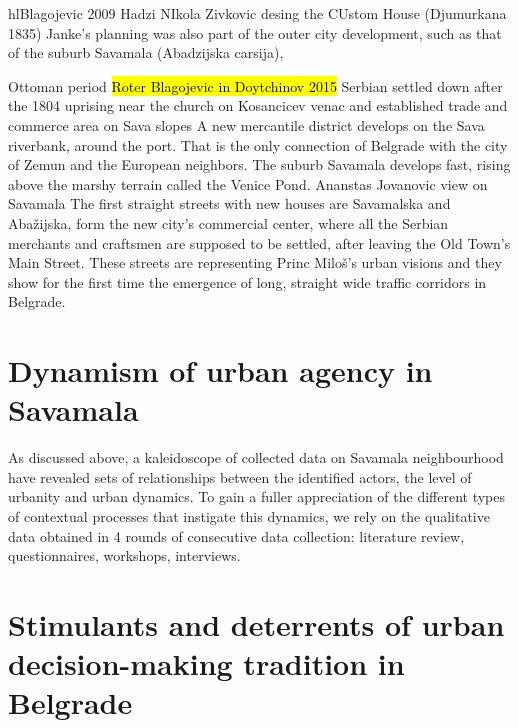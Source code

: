 \documentclass[11pt]{report}
\begin{document}
hl{Blagojevic 2009}
Hadzi NIkola Zivkovic desing the CUstom House (Djumurkana 1835)
Janke’s planning was also part of the outer city development, such as that of the suburb Savamala (Abadzijska carsija), 

Ottoman period
	\hl{Roter Blagojevic in Doytchinov 2015}
Serbian settled down after the 1804 uprising near the church on Kosancicev venac and established trade and commerce area on Sava slopes
A new mercantile district develops on the Sava riverbank, around the port. That is the only connection of Belgrade with the city of Zemun and the European neighbors. The suburb Savamala develops fast, rising above the marshy terrain called the Venice Pond.
Ananstas Jovanovic view on Savamala
The first straight streets with new  houses  are  Savamalska  and  Abažijska,  form  the  new  city’s  commercial center,  where  all  the  Serbian  merchants  and  craftsmen  are  supposed  to  be settled, after leaving the Old Town’s Main Street. These streets are representing Princ Miloš’s urban visions and they show for the first time the emergence of
long, straight wide traffic corridors in Belgrade.

\section{Dynamism of urban agency in Savamala}

As discussed above, a kaleidoscope of collected data on Savamala neighbourhood have revealed sets of relationships between the identified actors, the level of urbanity and urban dynamics. To gain a fuller appreciation of the different types of contextual processes that instigate this dynamics, we rely on the qualitative data obtained in 4 rounds of consecutive data collection: literature review, questionnaires, workshops, interviews. 

\section{Stimulants and deterrents of urban decision-making tradition in Belgrade}
\end{document}
